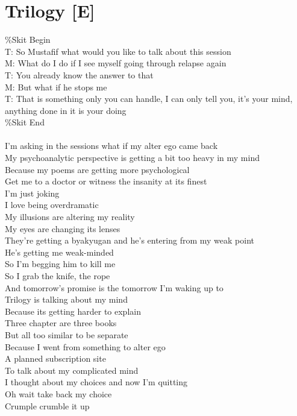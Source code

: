 \documentclass[12pt, b5paper, oneside]{book}
\begin{document}
\section{Trilogy [E]}
\%Skit Begin
\\T: So Mustafif what would you like to talk about this session
\\M: What do I do if I see myself going through relapse again
\\T: You already know the answer to that
\\M: But what if he stops me
\\T: That is something only you can handle, I can only tell you, it's your mind, anything done in it is your doing
\\\%Skit End
%
\\\\I'm asking in the sessions what if my alter ego came back
\\My psychoanalytic perspective is getting a bit too heavy in my mind
\\Because my poems are getting more psychological
\\Get me to a doctor or witness the insanity at its finest
\\I'm just joking
\\I love being overdramatic
\\My illusions are altering my reality
\\My eyes are changing its lenses
\\They're getting a byakyugan and he's entering from my weak point
\\He's getting me weak-minded
\\So I'm begging him to kill me
\\So I grab the knife, the rope
\\And tomorrow's promise is the tomorrow I'm waking up to
\\Trilogy is talking about my mind
\\Because its getting harder to explain 
\\Three chapter are three books
\\But all too similar to be separate
\\Because I went from something to alter ego
\\A planned subscription site
\\To talk about my complicated mind
\\I thought about my choices and now I'm quitting 
\\Oh wait take back my choice 
\\Crumple crumble it up 
\end{document}
